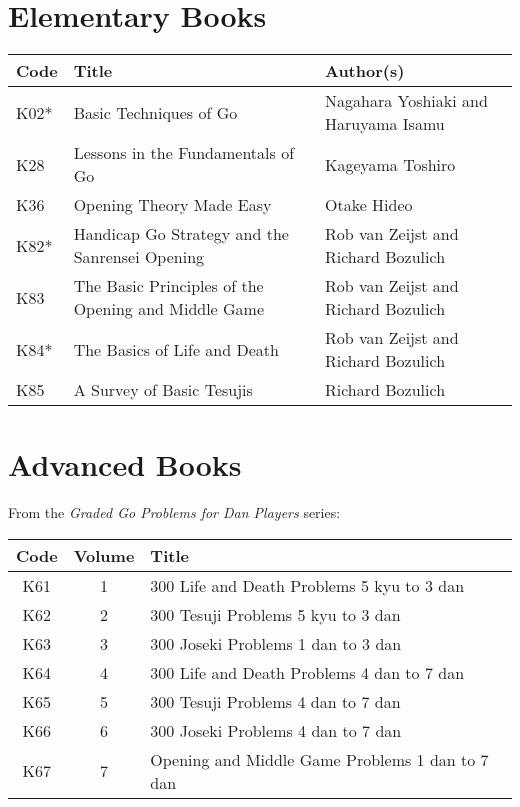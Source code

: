 \section{Elementary Books}

\begin{longtable}{l|p{55mm}|p{55mm}} 
    \hline
    \textbf{Code} & \textbf{Title} & \textbf{Author(s)} \\
    \hline \hline
    K02* & Basic Techniques of Go & Nagahara Yoshiaki and Haruyama Isamu \\
    \hline
    K28 & Lessons in the Fundamentals of Go & Kageyama Toshiro \\
    \hline
    K36 & Opening Theory Made Easy & Otake Hideo \\
    \hline
    K82* & Handicap Go Strategy and the Sanrensei Opening & Rob van Zeijst and Richard Bozulich \\
    \hline
    K83 & The Basic Principles of the Opening and Middle Game & Rob van Zeijst and Richard Bozulich \\
    \hline
    K84* & The Basics of Life and Death & Rob van Zeijst and Richard Bozulich \\
    \hline
    K85 & A Survey of Basic Tesujis & Richard Bozulich \\
    \hline
\end{longtable}

\section{Advanced Books}

From the \emph{Graded Go Problems for Dan Players} series:

\begin{longtable}{c|c|l} 
    \hline
    \textbf{Code} & \textbf{Volume} & \textbf{Title} \\
    \hline \hline
    K61 & 1 & 300 Life and Death Problems 5 kyu to 3 dan \\
    \hline
    K62 & 2 & 300 Tesuji Problems 5 kyu to 3 dan \\
    \hline
    K63 & 3 & 300 Joseki Problems 1 dan to 3 dan \\
    \hline
    K64 & 4 & 300 Life and Death Problems 4 dan to 7 dan \\
    \hline
    K65 & 5 & 300 Tesuji Problems 4 dan to 7 dan \\
    \hline
    K66 & 6 & 300 Joseki Problems 4 dan to 7 dan \\
    \hline
    K67 & 7 & Opening and Middle Game Problems 1 dan to 7 dan \\
    \hline
\end{longtable}

